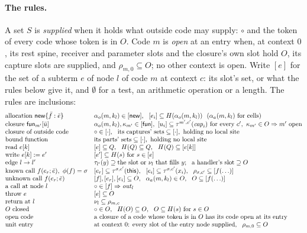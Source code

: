 \documentclass[10pt,a4paper]{article}
\theoremstyle{definition}
\theoremstyle{remark}
\newcommand{\kw}[1]{\mathsf{#1}}
\begin{document}
\paragraph{The rules.} A set $S$ is \emph{supplied} when it holds what
outside code may supply: $\circ$ and the token of every code whose token
is in $O$. Code $m$ is \emph{open} at an entry when, at context $0$, its
rest spine, receiver and parameter slots and the closure's own slot hold
$O$, its capture slots are supplied, and $\rho_{m,0}\subseteq O$; no other
context is open. Write $[e]$ for the set of a subterm $e$ of node $l$ of
code $m$ at context $c$: its slot's set, or what the
rules below give it, and $\emptyset$ for a test, an arithmetic operation
or a length. The rules are inclusions:
\[
\begin{array}{@{}l@{\quad}l@{}}
\text{allocation }\kw{new}\{\bar f:\bar e\} & \alpha_o(m,k_l)\in[\kw{new}],\ \ [e_i]\subseteq H(\alpha_o(m,k_l))\ \ (\alpha_a(m,k_l)\text{ for cells})\\
\text{closure }\kw{fun}_{m'}[\bar u] & \alpha_o(m,k_l),\kappa_{m'}\in[\kw{fun}],\ [u_i]\subseteq\tau^{m',c'}(\mathit{cap}_i)\text{ for every }c',\ \kappa_{m'}\in O\Rightarrow m'\text{ open}\\
\text{closure of outside code} & \circ\in[\cdot],\ \ \text{its captures' sets}\subseteq[\cdot],\text{ holding no local site}\\
\text{bound function} & \text{its parts' sets}\subseteq[\cdot],\text{ holding no local site}\\
\text{read }e[k] & [e]\subseteq Q,\ \ H(Q)\subseteq Q,\ \ H(Q)\subseteq[e[k]]\\
\text{write }e[k]:=e' & [e']\subseteq H(s)\ \text{for}\ s\in[e]\\
\text{edge }l\to l' & \tau_{l'}(y)\supseteq\text{the slot or }\nu_l\text{ that fills }y;\ \ \text{a handler's slot}\supseteq O\\
\text{known call }f(e_r;\bar e),\ \phi(f)=\sigma & [e_r]\subseteq\tau^{\sigma,c'}(\kw{this}),\ \ [e_i]\subseteq\tau^{\sigma,c'}(x_i),\ \ \rho_{\sigma,c'}\subseteq[f(\ldots)]\\
\text{unknown call }f(e_r;\bar e) & [f],[e_r],[e_i]\subseteq O,\ \ \alpha_a(m,k_l)\in O,\ \ O\subseteq[f(\ldots)]\\
\text{a call at node }l & \circ\in[f]\Rightarrow\mathit{out}_l\\
\text{throw }e & [e]\subseteq O\\
\text{return at }l & \nu_l\subseteq\rho_{m,c}\\
O\text{ closed} & \circ\in O,\ \ H(O)\subseteq O,\ \ O\subseteq H(s)\ \text{for}\ s\in O\\
\text{open code} & \text{a closure of a code whose token is in }O\text{ has its code open at its entry}\\
\text{unit entry} & \text{at context }0\text{: every slot of the entry node supplied},\ \ \rho_{m,0}\subseteq O
\end{array}
\]
\end{document}

